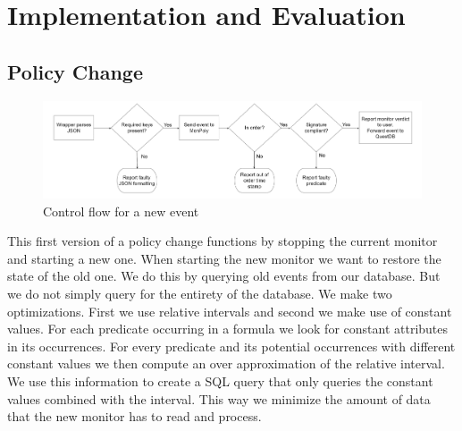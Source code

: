 \chapter{Implementation and Evaluation}
\section{Policy Change}
% 

\begin{figure}
    \label{fig:flowchart}
    \centering
    \includegraphics[width=\linewidth]{diagrams/flowchart-2.png}
    \caption{Control flow for a new event}
\end{figure}

This first version of a policy change functions by stopping the current monitor and starting a new one.
When starting the new monitor we want to restore the state of the old one.
We do this by querying old events from our database.
But we do not simply query for the entirety of the database.
We make two optimizations.
First we use relative intervals and second we make use of constant values.
For each predicate occurring in a formula we look for constant attributes in its occurrences.
For every predicate and its potential occurrences with different constant values we then compute an over approximation of the relative interval.
We use this information to create a SQL query that only queries the constant values combined with the interval.
This way we minimize the amount of data that the new monitor has to read and process.
